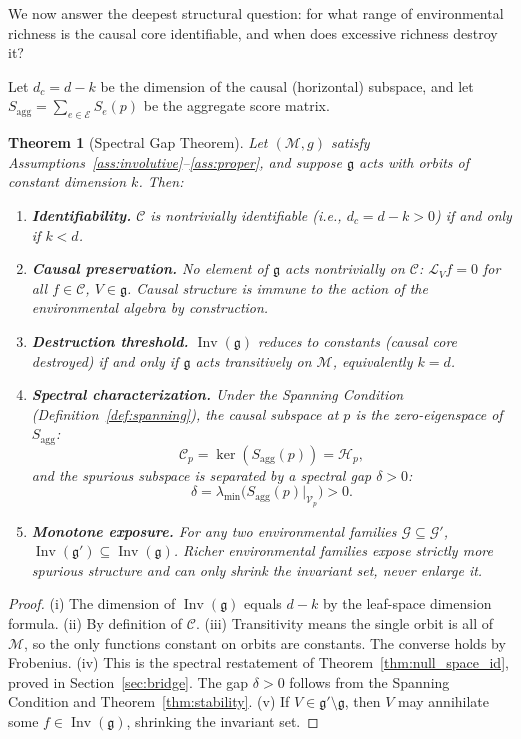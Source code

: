 \documentclass[11pt,a4paper]{article}
\newtheorem{theorem}{Theorem}[section]
\DeclareMathOperator{\Inv}{Inv}
\newcommand{\g}{\mathfrak{g}}
\newcommand{\cC}{\mathcal{C}}
\newcommand{\cM}{\mathcal{M}}
\newcommand{\cG}{\mathcal{G}}
\newcommand{\cH}{\mathcal{H}}
\newcommand{\cV}{\mathcal{V}}
\newcommand{\cE}{\mathcal{E}}
\newcommand{\LP}{\mathcal{L}}
\begin{document}
We now answer the deepest structural question: for what range of environmental richness is the causal core identifiable, and when does excessive richness destroy it?

Let $d_c = d - k$ be the dimension of the causal (horizontal) subspace, and let $S_{\mathrm{agg}} = \sum_{e \in \cE} S_e(p)$ be the aggregate score matrix.

\begin{theorem}[Spectral Gap Theorem]\label{thm:spectral_gap}
Let $(\cM, g)$ satisfy Assumptions~\ref{ass:involutive}--\ref{ass:proper}, and suppose $\g$ acts with orbits of constant dimension $k$. Then:
\begin{enumerate}[label=(\roman*)]
\item \textbf{Identifiability.} $\cC$ is nontrivially identifiable (i.e., $d_c = d - k > 0$) if and only if $k < d$.
\item \textbf{Causal preservation.} No element of $\g$ acts nontrivially on $\cC$: $\LP_V f = 0$ for all $f \in \cC$, $V \in \g$. Causal structure is immune to the action of the environmental algebra by construction.
\item \textbf{Destruction threshold.} $\Inv(\g)$ reduces to constants (causal core destroyed) if and only if $\g$ acts transitively on $\cM$, equivalently $k = d$.
\item \textbf{Spectral characterization.} Under the Spanning Condition (Definition~\ref{def:spanning}), the causal subspace at $p$ is the zero-eigenspace of $S_{\mathrm{agg}}$:
\[
\cC_p = \ker(S_{\mathrm{agg}}(p)) = \cH_p,
\]
and the spurious subspace is separated by a spectral gap $\delta > 0$:
\[
\delta = \lambda_{\min}\!\bigl(S_{\mathrm{agg}}(p)\big|_{\cV_p}\bigr) > 0.
\]
\item \textbf{Monotone exposure.} For any two environmental families $\cG \subseteq \cG'$, $\Inv(\g') \subseteq \Inv(\g)$. Richer environmental families expose strictly more spurious structure and can only shrink the invariant set, never enlarge it.
\end{enumerate}
\end{theorem}

\begin{proof}
(i) The dimension of $\Inv(\g)$ equals $d - k$ by the leaf-space dimension formula. (ii) By definition of $\cC$. (iii) Transitivity means the single orbit is all of $\cM$, so the only functions constant on orbits are constants. The converse holds by Frobenius. (iv) This is the spectral restatement of Theorem~\ref{thm:null_space_id}, proved in Section~\ref{sec:bridge}. The gap $\delta > 0$ follows from the Spanning Condition and Theorem~\ref{thm:stability}. (v) If $V \in \g' \setminus \g$, then $V$ may annihilate some $f \in \Inv(\g)$, shrinking the invariant set.
\end{proof}
\end{document}
